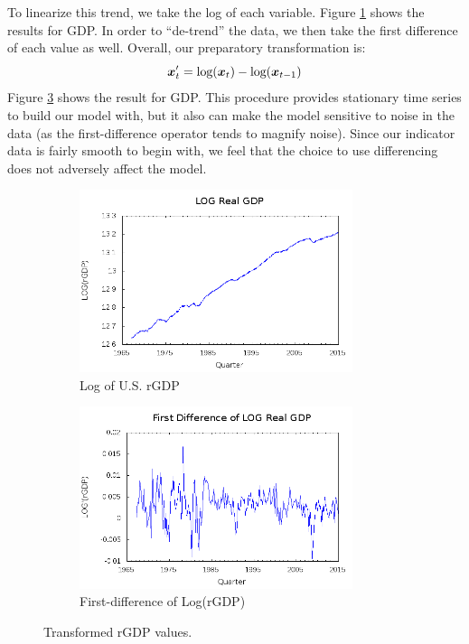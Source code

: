     To linearize this trend, we take the log of each variable.  Figure 
    \ref{fig:rgdp-log} shows the results for GDP.  In order to ``de-trend'' the
    data, we then take the first difference of each value as well.  Overall, 
    our preparatory transformation is:
        \begin{equation} \boldsymbol{x}'_t = \text{log}(\boldsymbol{x}_t) - \text{log}(\boldsymbol{x}_{t-1}) \end{equation}
    Figure \ref{fig:rgdp-fdlog} shows the result for GDP.  This procedure 
    provides stationary time series to build our model with, but it also can 
    make the model sensitive to noise in the data (as the first-difference 
    operator tends to magnify noise). Since our indicator data is fairly smooth 
    to begin with, we feel that the choice to use differencing does not 
    adversely affect the model.
        
    \begin{figure}
        \begin{subfigure}{0.5\textwidth}
            \includegraphics[width=8cm]{../img/rgdp-log.png}
            \caption{Log of U.S. rGDP}
            \label{fig:rgdp-log}
        \end{subfigure}
        \begin{subfigure}{0.5\textwidth}
            \includegraphics[width=8cm]{../img/rgdp-fdlog.png}
            \caption{First-difference of Log(rGDP)}
            \label{fig:rgdp-fdlog}
        \end{subfigure}
        \caption{Transformed rGDP values.}
    \end{figure}

